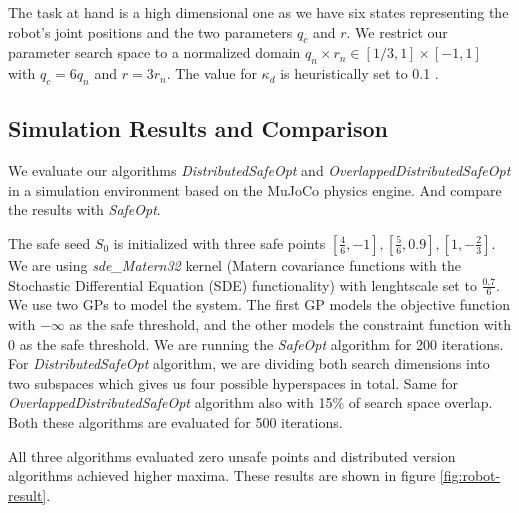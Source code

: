 The task at hand is a high dimensional one as we have six states representing the robot's joint positions and the two parameters $q_c$ and $r$. We restrict our parameter search space to a normalized domain $q_n \times r_n \in [1/3,1] \times [-1,1]$ with $q_c = 6q_n$ and $r = 3r_n$. The value for $\kappa_d$ is heuristically set to 0.1 \cite{gosafeopt}.

\subsection{Simulation Results and Comparison}
We evaluate our algorithms \textit{DistributedSafeOpt} and \textit{OverlappedDistributedSafeOpt} in a simulation environment based on the MuJoCo physics engine. And compare the results with \textit{SafeOpt}. 

The safe seed $S_0$ is initialized with three safe points $[\frac{4}{6},-1],[\frac{5}{6},0.9],[1,-\frac{2}{3}]$. We are using \textit{sde\_Matern32} kernel (Matern covariance functions with the Stochastic Differential Equation (SDE) functionality) with lenghtscale set to $\frac{0.7}{6}$.
We use two GPs to model the system. The first GP models the objective function with $-\infty$ as the safe threshold, and the other models the constraint function with 0 as the safe threshold.
We are running the \textit{SafeOpt} algorithm for 200 iterations. For \textit{DistributedSafeOpt} algorithm, we are dividing both search dimensions into two subspaces which gives us four possible hyperspaces in total. Same for \textit{OverlappedDistributedSafeOpt} algorithm also with 15\% of search space overlap. Both these algorithms are evaluated for 500 iterations.

All three algorithms evaluated zero unsafe points and distributed version algorithms achieved higher maxima. These results are shown in figure \ref{fig:robot-result}.

